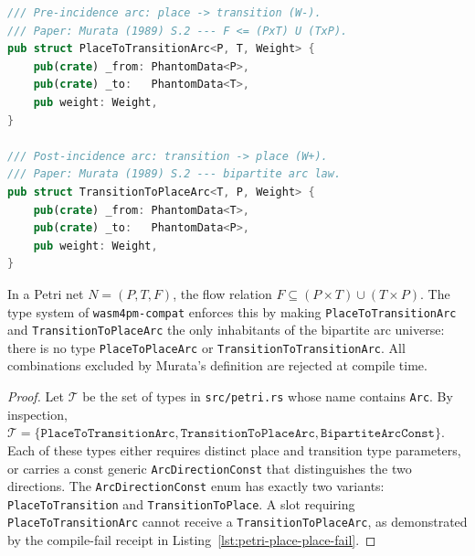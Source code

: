 \begin{lstlisting}[language=Rust,
  caption={\texttt{PlaceToTransitionArc} and \texttt{TransitionToPlaceArc}: the only two
    arc inhabitants. No \texttt{PlaceToPlaceArc} type exists in this crate.},
  label={lst:petri-arcs}]
/// Pre-incidence arc: place -> transition (W-).
/// Paper: Murata (1989) S.2 --- F <= (PxT) U (TxP).
pub struct PlaceToTransitionArc<P, T, Weight> {
    pub(crate) _from: PhantomData<P>,
    pub(crate) _to:   PhantomData<T>,
    pub weight: Weight,
}

/// Post-incidence arc: transition -> place (W+).
/// Paper: Murata (1989) S.2 --- bipartite arc law.
pub struct TransitionToPlaceArc<T, P, Weight> {
    pub(crate) _from: PhantomData<T>,
    pub(crate) _to:   PhantomData<P>,
    pub weight: Weight,
}
\end{lstlisting}

\begin{theorem}
\label{thm:petri-arc-law}
In a Petri net $N = (P, T, F)$, the flow relation $F \subseteq (P \times T) \cup (T \times P)$.
The type system of \texttt{wasm4pm-compat} enforces this by making
\texttt{PlaceToTransitionArc} and \texttt{TransitionToPlaceArc} the only inhabitants
of the bipartite arc universe: there is no type \texttt{PlaceToPlaceArc} or
\texttt{TransitionToTransitionArc}. All combinations excluded by Murata's definition are
rejected at compile time.
\end{theorem}

\begin{proof}
Let $\mathcal{T}$ be the set of types in \texttt{src/petri.rs} whose name contains
\texttt{Arc}. By inspection, $\mathcal{T} = \{\texttt{PlaceToTransitionArc},
\texttt{TransitionToPlaceArc}, \texttt{BipartiteArcConst}\}$. Each of these types either
requires distinct place and transition type parameters, or carries a const generic
\texttt{ArcDirectionConst} that distinguishes the two directions. The
\texttt{ArcDirectionConst} enum has exactly two variants:
\texttt{PlaceToTransition} and \texttt{TransitionToPlace}. A slot requiring
\texttt{PlaceToTransitionArc} cannot receive a \texttt{TransitionToPlaceArc}, as
demonstrated by the compile-fail receipt in Listing~\ref{lst:petri-place-place-fail}.
\end{proof}

